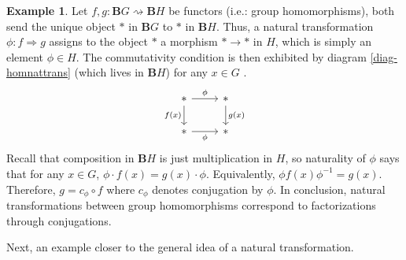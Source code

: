 \documentclass{article}
\theoremstyle{definition}
\newtheorem{exmp}[thm]{Example}
\theoremstyle{remark}
\begin{document}
\begin{exmp}\label{exmp-grouphom}
	Let $f,g: \mathbf{B}G \rightsquigarrow \mathbf{B}H$ be functors (i.e.: group homomorphisms), both send the unique object $*$ in $\mathbf{B}G$ to $*$ in $\mathbf{B}H$. Thus, a natural transformation $\phi : f\Rightarrow g$ assigns to the object $*$ a morphism $* \rightarrow *$ in $H$, which is simply an element $\phi \in H$. The commutativity condition is then exhibited by diagram \eqref{diag-homnattrans} (which lives in $\mathbf{B}H$) for any $x \in G$ .
	\begin{equation}\label{diag-homnattrans}
	\begin{tikzcd}
	* \arrow[d, "f(x)"'] \arrow[r, "\phi"] & * \arrow[d, "g(x)"] \\
	* \arrow[r, "\phi"'] & *
	\end{tikzcd}
	\end{equation}
	Recall that composition in $\mathbf{B}H$ is just multiplication in $H$, so naturality of $\phi$ says that for any $x \in G$, $\phi \cdot f(x) = g(x) \cdot \phi$. Equivalently, $\phi f(x) \phi^{-1} = g(x)$. Therefore, $g = c_{\phi} \circ f$ where $c_{\phi}$ denotes conjugation by $\phi$. In conclusion, natural transformations between group homomorphisms correspond to factorizations through conjugations.
\end{exmp}
Next, an example closer to the general idea of a natural transformation.
\end{document}
